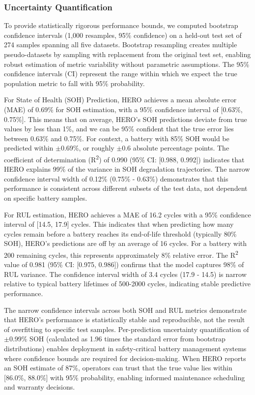\documentclass[5p,times,authoryear]{elsarticle}
\begin{document}
\subsubsection{Uncertainty Quantification}

To provide statistically rigorous performance bounds, we computed bootstrap confidence intervals (1,000 resamples, 95\% confidence) on a held-out test set of 274 samples spanning all five datasets. Bootstrap resampling creates multiple pseudo-datasets by sampling with replacement from the original test set, enabling robust estimation of metric variability without parametric assumptions. The 95\% confidence intervals (CI) represent the range within which we expect the true population metric to fall with 95\% probability.

For State of Health (SOH) Prediction, HERO achieves a mean absolute error (MAE) of 0.69\% for SOH estimation, with a 95\% confidence interval of [0.63\%, 0.75\%]. This means that on average, HERO's SOH predictions deviate from true values by less than 1\%, and we can be 95\% confident that the true error lies between 0.63\% and 0.75\%. For context, a battery with 85\% SOH would be predicted within $\pm$0.69\%, or roughly $\pm$0.6 absolute percentage points. The coefficient of determination (R\textsuperscript{2}) of 0.990 (95\% CI: [0.988, 0.992]) indicates that HERO explains 99\% of the variance in SOH degradation trajectories. The narrow confidence interval width of 0.12\% (0.75\% - 0.63\%) demonstrates that this performance is consistent across different subsets of the test data, not dependent on specific battery samples.

For RUL estimation, HERO achieves a MAE of 16.2 cycles with a 95\% confidence interval of [14.5, 17.9] cycles. This indicates that when predicting how many cycles remain before a battery reaches its end-of-life threshold (typically 80\% SOH), HERO's predictions are off by an average of 16 cycles. For a battery with 200 remaining cycles, this represents approximately 8\% relative error. The R\textsuperscript{2} value of 0.981 (95\% CI: [0.975, 0.986]) confirms that the model captures 98\% of RUL variance. The confidence interval width of 3.4 cycles (17.9 - 14.5) is narrow relative to typical battery lifetimes of 500-2000 cycles, indicating stable predictive performance.

The narrow confidence intervals across both SOH and RUL metrics demonstrate that HERO's performance is statistically stable and reproducible, not the result of overfitting to specific test samples. Per-prediction uncertainty quantification of $\pm$0.99\% SOH (calculated as 1.96 times the standard error from bootstrap distributions) enables deployment in safety-critical battery management systems where confidence bounds are required for decision-making. When HERO reports an SOH estimate of 87\%, operators can trust that the true value lies within [86.0\%, 88.0\%] with 95\% probability, enabling informed maintenance scheduling and warranty decisions.
\end{document}
